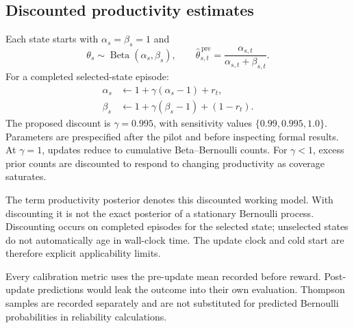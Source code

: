 \documentclass[final,5p,times,number]{elsarticle}
\begin{document}
\subsection{Discounted productivity estimates}
Each state starts with $\alpha_s=\beta_s=1$ and
\begin{equation}
\theta_s\sim\operatorname{Beta}(\alpha_s,\beta_s),\qquad
\widehat{\theta}_{s,t}^{\,\mathrm{pre}}
=\frac{\alpha_{s,t}}{\alpha_{s,t}+\beta_{s,t}}.
\end{equation}
For a completed selected-state episode:
\begin{align}
\alpha_s&\leftarrow1+\gamma(\alpha_s-1)+r_t,\\
\beta_s&\leftarrow1+\gamma(\beta_s-1)+(1-r_t).
\label{eq:update}
\end{align}
The proposed discount is $\gamma=0.995$, with sensitivity values $\{0.99,0.995,1.0\}$. Parameters are prespecified after the pilot and before inspecting formal results. At $\gamma=1$, updates reduce to cumulative Beta--Bernoulli counts. For $\gamma<1$, excess prior counts are discounted to respond to changing productivity as coverage saturates.

The term productivity posterior denotes this discounted working model. With discounting it is not the exact posterior of a stationary Bernoulli process. Discounting occurs on completed episodes for the selected state; unselected states do not automatically age in wall-clock time. The update clock and cold start are therefore explicit applicability limits.

Every calibration metric uses the pre-update mean recorded before reward. Post-update predictions would leak the outcome into their own evaluation. Thompson samples are recorded separately and are not substituted for predicted Bernoulli probabilities in reliability calculations.
\end{document}
